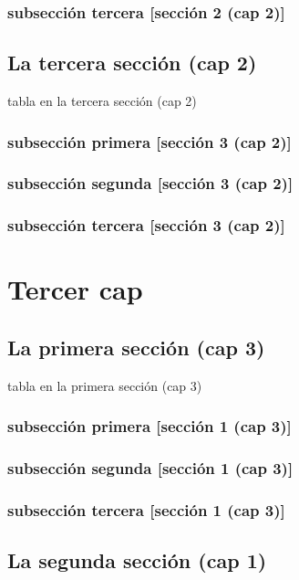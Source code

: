 \documentclass[12pt,a4paper]{report}
\begin{document}
\subsection{subsección tercera [sección 2 (cap 2)]}
\section{La tercera sección (cap 2)}
\begin{table}[H]
\caption{tabla en la tercera sección (cap 2)}
\end{table}
\subsection{subsección primera [sección 3 (cap 2)]}
\subsection{subsección segunda [sección 3 (cap 2)]}
\subsection{subsección tercera [sección 3 (cap 2)]}

\chapter{Tercer cap}
\section{La primera sección (cap 3)}
\begin{table}[H]
\caption{tabla en la primera sección (cap 3)}
\end{table}
\subsection{subsección primera [sección 1 (cap 3)]}
\subsection{subsección segunda [sección 1 (cap 3)]}
\subsection{subsección tercera [sección 1 (cap 3)]}
\section{La segunda sección (cap 1)}
\end{document}
